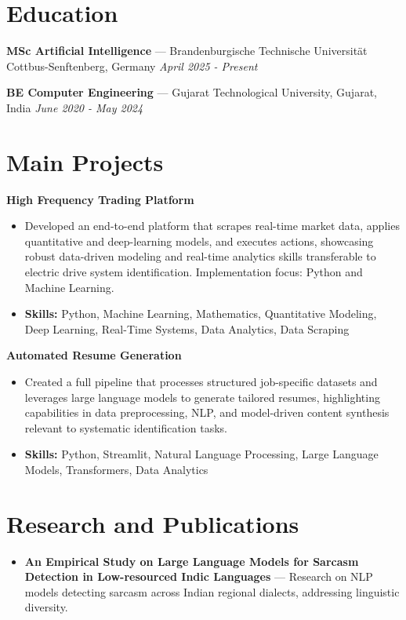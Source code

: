 \documentclass[a4paper,10pt]{article}
\begin{document}
\section*{Education}
\textbf{MSc Artificial Intelligence} — Brandenburgische Technische Universität Cottbus-Senftenberg, Germany \hfill \textit{April 2025 - Present}\par
\vspace{1.5pt}
\textbf{BE Computer Engineering} — Gujarat Technological University, Gujarat, India \hfill \textit{June 2020 - May 2024}\par

\section*{Main Projects}
\textbf{High Frequency Trading Platform}\par
\vspace{1pt}
\begin{itemize}
  \item Developed an end-to-end platform that scrapes real-time market data, applies quantitative and deep-learning models, and executes actions, showcasing robust data-driven modeling and real-time analytics skills transferable to electric drive system identification. Implementation focus: Python and Machine Learning.
  \item \textbf{Skills:} Python, Machine Learning, Mathematics, Quantitative Modeling, Deep Learning, Real-Time Systems, Data Analytics, Data Scraping
\end{itemize}
\vspace{3pt}
\textbf{Automated Resume Generation}\par
\vspace{1pt}
\begin{itemize}
  \item Created a full pipeline that processes structured job-specific datasets and leverages large language models to generate tailored resumes, highlighting capabilities in data preprocessing, NLP, and model-driven content synthesis relevant to systematic identification tasks.
  \item \textbf{Skills:} Python, Streamlit, Natural Language Processing, Large Language Models, Transformers, Data Analytics
\end{itemize}

\section*{Research and Publications}
\begin{itemize}
\item \textbf{An Empirical Study on Large Language Models for Sarcasm Detection in Low-resourced Indic Languages} — Research on NLP models detecting sarcasm across Indian regional dialects, addressing linguistic diversity.
\end{itemize}
\end{document}
